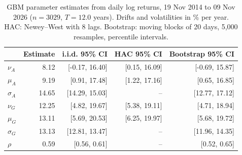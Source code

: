 \begin{table}
\caption{GBM parameter estimates from daily log returns, 19 Nov 2014 to 09 Nov 2026 ($n=3029$, $T=12.0$ years). Drifts and volatilities in \% per year. HAC: Newey--West with 8 lags. Bootstrap: moving blocks of 20 days, 5,000 resamples, percentile intervals.}
\label{tab:estimates}
\begin{tabular}{lrrrr}
\toprule
 & Estimate & i.i.d. 95\% CI & HAC 95\% CI & Bootstrap 95\% CI \\
\midrule
$\nu_A$ & 8.12 & [-0.17, 16.40] & [0.15, 16.09] & [-0.69, 15.87] \\
$\mu_A$ & 9.19 & [0.91, 17.48] & [1.22, 17.16] & [0.65, 16.85] \\
$\sigma_A$ & 14.65 & [14.29, 15.03] & -- & [12.77, 17.12] \\
$\nu_G$ & 12.25 & [4.82, 19.67] & [5.38, 19.11] & [4.71, 18.94] \\
$\mu_G$ & 13.11 & [5.69, 20.53] & [6.25, 19.97] & [5.68, 19.72] \\
$\sigma_G$ & 13.13 & [12.81, 13.47] & -- & [11.96, 14.35] \\
$\rho$ & 0.59 & [0.56, 0.61] & -- & [0.52, 0.65] \\
\bottomrule
\end{tabular}
\end{table}
